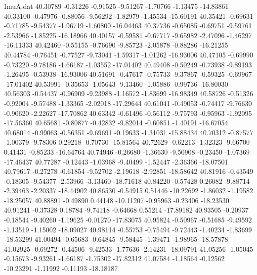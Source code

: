 \begin{filecontents}{ImuA.dat}
  40.30789   -0.31226   -0.91525   -9.51267   -1.70766   -1.13475  -14.83861
  40.33100   -0.47976   -0.88056   -9.56292   -1.82979   -1.45534  -15.60191
  40.35421   -0.69631   -0.71785   -9.54377   -1.96719   -1.60800  -16.04463
  40.37736   -0.65085   -0.69751   -9.59761   -2.53966   -1.85225  -16.18966
  40.40157   -0.59581   -0.67717   -9.65982   -2.47096   -1.46297  -16.11333
  40.42460   -0.55155   -0.76690   -9.85723   -2.05878   -0.88286  -16.21255
  40.44784   -0.76451   -0.77527   -9.73041   -1.59317   -1.01262  -16.93006
  40.47105   -0.69990   -0.73220   -9.78186   -1.66187   -1.03552  -17.01402
  40.49408   -0.50249   -0.73938   -9.89193   -1.26495   -0.53938  -16.93006
  40.51691   -0.47617   -0.75733   -9.37867   -0.59325   -0.69967  -17.01402
  40.53991   -0.35653   -1.05643   -9.13460   -1.05886   -0.99736  -16.80030
  40.56303   -0.54437   -0.96909   -9.23988   -1.16572   -1.83699  -16.98349
  40.58726   -0.51326   -0.92004   -9.57488   -1.33365   -2.02018  -17.29644
  40.61041   -0.49053   -0.74417   -9.76630   -0.90620   -2.22627  -17.70862
  40.63342   -0.61496   -0.56112   -9.75793   -0.95963   -1.92095  -17.56360
  40.65681   -0.80877   -0.42832   -9.82014   -0.60851   -1.40191  -16.67054
  40.68014   -0.99063   -0.56351   -9.69691   -0.19633   -1.31031  -15.88434
  40.70312   -0.87577   -1.00379   -9.78306    0.29218   -0.70730  -15.81564
  40.72629   -0.62213   -1.32323   -9.66700    0.41431   -0.85233  -16.64764
  40.74946   -0.26680   -1.36630   -9.50908   -0.23450   -1.07369  -17.46437
  40.77287   -0.12443   -1.03968   -9.40499   -1.52447   -2.36366  -18.07501
  40.79617   -0.27278   -0.61854   -9.52702   -2.19618   -2.92851  -18.58642
  40.81916   -0.43549   -0.18305   -9.54377   -2.53966   -3.13460  -18.71618
  40.84220   -0.57428    0.26082   -9.88714   -2.39463   -2.20337  -18.44902
  40.86530   -0.54915    0.51446  -10.22692   -1.86032   -1.19582  -18.25057
  40.88891   -0.49890    0.44148  -10.11207   -0.95963   -0.23406  -18.23530
  40.91241   -0.37328    0.18784   -9.74118   -0.64668    0.55214  -17.89182
  40.93505   -0.20937   -0.18544   -9.40260   -1.19625   -0.01270  -17.83075
  40.95824   -0.50967   -0.51685   -9.49592   -1.13519   -1.15002  -18.09027
  40.98114   -0.55753   -0.75494   -9.72443   -1.40234   -1.83699  -18.53299
  41.00494   -0.65683   -0.64845   -9.58445   -1.39471   -1.98965  -18.57878
  41.02925   -0.69272   -0.44506   -9.42533   -1.77636   -2.14231  -18.09791
  41.05256   -1.05045   -0.15673   -9.93261   -1.66187   -1.75302  -17.82312
  41.07584   -1.18564   -0.12562  -10.23291   -1.11992   -0.11193  -18.18187

\end{filecontents}
